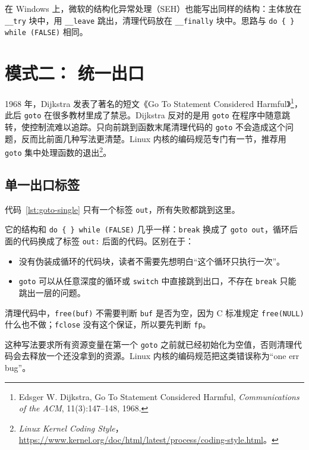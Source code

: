 在 Windows 上，微软的结构化异常处理（SEH）也能写出同样的结构：主体放在 \texttt{\_\_try} 块中，用 \texttt{\_\_leave} 跳出，清理代码放在 \texttt{\_\_finally} 块中。思路与 \texttt{do \{ \} while (FALSE)} 相同。

\section{模式二：\texorpdfstring{}{goto} 统一出口}
\label{sec:goto}

1968 年，Dijkstra 发表了著名的短文《Go To Statement Considered Harmful》\footnote{Edsger W. Dijkstra, Go To Statement Considered Harmful, \emph{Communications of the ACM}, 11(3):147--148, 1968.}，此后 \texttt{goto} 在很多教材里成了禁忌。Dijkstra 反对的是用 \texttt{goto} 在程序中随意跳转，使控制流难以追踪。只向前跳到函数末尾清理代码的 \texttt{goto} 不会造成这个问题，反而比前面几种写法更清楚。Linux 内核的编码规范专门有一节，推荐用 \texttt{goto} 集中处理函数的退出\footnote{\emph{Linux Kernel Coding Style}，\url{https://www.kernel.org/doc/html/latest/process/coding-style.html}。}。

\subsection{单一出口标签}

代码~\ref{lst:goto-single} 只有一个标签 \texttt{out}，所有失败都跳到这里。


它的结构和 \texttt{do \{ \} while (FALSE)} 几乎一样：\texttt{break} 换成了 \texttt{goto out}，循环后面的代码换成了标签 \texttt{out:} 后面的代码。区别在于：
\begin{itemize}
  \item 没有伪装成循环的代码块，读者不需要先想明白“这个循环只执行一次”。
  \item \texttt{goto} 可以从任意深度的循环或 \texttt{switch} 中直接跳到出口，不存在 \texttt{break} 只能跳出一层的问题。
\end{itemize}

清理代码中，\texttt{free(buf)} 不需要判断 \texttt{buf} 是否为空，因为 C 标准规定 \texttt{free(NULL)} 什么也不做；\texttt{fclose} 没有这个保证，所以要先判断 \texttt{fp}。

这种写法要求所有资源变量在第一个 \texttt{goto} 之前就已经初始化为空值，否则清理代码会去释放一个还没拿到的资源。Linux 内核的编码规范把这类错误称为“one err bug”。

